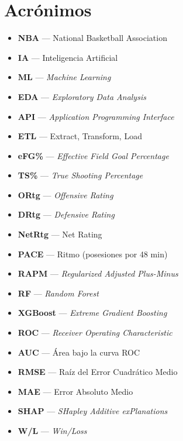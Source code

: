 \cleardoublepage
{}
\chapter*{Acrónimos}

\begin{itemize}
  \item \textbf{NBA} — National Basketball Association
  \item \textbf{IA} — Inteligencia Artificial
  \item \textbf{ML} — \textit{Machine Learning}
  \item \textbf{EDA} — \textit{Exploratory Data Analysis}
  \item \textbf{API} — \textit{Application Programming Interface}
  \item \textbf{ETL} — Extract, Transform, Load

  \item \textbf{eFG\%} — \textit{Effective Field Goal Percentage}
  \item \textbf{TS\%} — \textit{True Shooting Percentage}
  \item \textbf{ORtg} — \textit{Offensive Rating}
  \item \textbf{DRtg} — \textit{Defensive Rating}
  \item \textbf{NetRtg} — Net Rating
  \item \textbf{PACE} — Ritmo (posesiones por 48 min)
  \item \textbf{RAPM} — \textit{Regularized Adjusted Plus-Minus}

  \item \textbf{RF} — \textit{Random Forest}
  \item \textbf{XGBoost} — \textit{Extreme Gradient Boosting}
  \item \textbf{ROC} — \textit{Receiver Operating Characteristic}
  \item \textbf{AUC} — Área bajo la curva ROC
  \item \textbf{RMSE} — Raíz del Error Cuadrático Medio
  \item \textbf{MAE} — Error Absoluto Medio
  \item \textbf{SHAP} — \textit{SHapley Additive exPlanations}

  \item \textbf{W/L} — \textit{Win/Loss}
\end{itemize}
